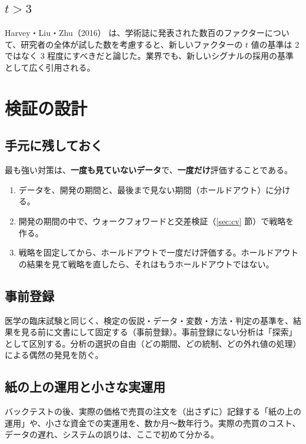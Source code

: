 \subsection{\texorpdfstring{$t > 3$}{t > 3}}

Harvey・Liu・Zhu（2016）\cite{hlz2016} は、学術誌に発表された数百のファクターについて、研究者の全体が試した数を考慮すると、新しいファクターの $t$ 値の基準は 2 ではなく 3 程度にすべきだと論じた。業界でも、新しいシグナルの採用の基準として広く引用される。

\section{検証の設計}

\subsection{手元に残しておく}

最も強い対策は、\textbf{一度も見ていないデータ}で、\textbf{一度だけ}評価することである。

\begin{enumerate}
\item データを、開発の期間と、最後まで見ない期間（ホールドアウト）に分ける。
\item 開発の期間の中で、ウォークフォワードと交差検証（\ref{sec:cv} 節）で戦略を作る。
\item 戦略を固定してから、ホールドアウトで一度だけ評価する。ホールドアウトの結果を見て戦略を直したら、それはもうホールドアウトではない。
\end{enumerate}

\subsection{事前登録}

医学の臨床試験と同じく、検定の仮説・データ・変数・方法・判定の基準を、結果を見る前に文書にして固定する（事前登録）。事前登録にない分析は「探索」として区別する。分析の選択の自由（どの期間、どの統制、どの外れ値の処理）による偶然の発見を防ぐ。

\subsection{紙の上の運用と小さな実運用}

バックテストの後、実際の価格で売買の注文を（出さずに）記録する「紙の上の運用」や、小さな資金での実運用を、数か月〜数年行う。実際の売買のコスト、データの遅れ、システムの誤りは、ここで初めて分かる。


